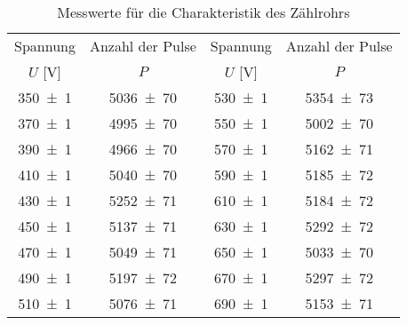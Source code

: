 \begin{table}[!h]
	\centering
	\begin{tabular}{|c|c||c|c|}
		\hline
		Spannung & Anzahl der Pulse & Spannung & Anzahl der Pulse\\
		$U$ [\si{\volt}] & $P$ & $U$ [\si{\volt}] & $P$ \\
\hline\hline
		\num{350(1)} & \num{5036(70)} & \num{530(1)} & \num{5354(73)}\\
		\num{370(1)} & \num{4995(70)} & \num{550(1)} & \num{5002(70)}\\
		\num{390(1)} & \num{4966(70)} & \num{570(1)} & \num{5162(71)}\\
		\num{410(1)} & \num{5040(70)} & \num{590(1)} & \num{5185(72)}\\
		\num{430(1)} & \num{5252(71)} & \num{610(1)} & \num{5184(72)}\\
		\num{450(1)} & \num{5137(71)} & \num{630(1)} & \num{5292(72)}\\
		\num{470(1)} & \num{5049(71)} & \num{650(1)} & \num{5033(70)}\\
		\num{490(1)} & \num{5197(72)} & \num{670(1)} & \num{5297(72)}\\
		\num{510(1)} & \num{5076(71)} & \num{690(1)} & \num{5153(71)}\\
		\hline
	\end{tabular}
	\caption{Messwerte für die Charakteristik des Zählrohrs \label{tab:Auswertung_Charakteristik}}
\end{table}
